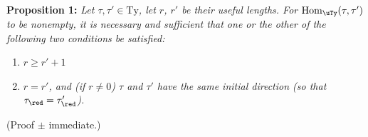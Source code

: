\textbf{Proposition 1:} \textit{Let $\tau,\tau'\in\mathrm{Ty}$, let $r$, $r'$ be their useful lengths. For $\mathrm{Hom}_{\uTy}(\tau,\tau')$ to be nonempty, it is necessary and sufficient that one or the other of the following two conditions be satisfied:}

\begin{enumerate}[label={}, leftmargin=*]
\item[\textit{a)}] $r\geq r'+1$


\item[\textit{b)}] \textit{$r=r'$, and (if $r\neq0$) $\tau$ and $\tau'$ have the same initial direction (so that $\tau_{\red}=\tau'_{\red}$).}
\end{enumerate}

(Proof $\pm$ immediate.)

